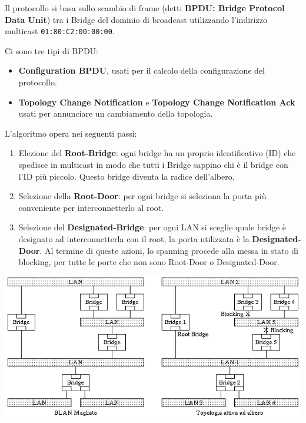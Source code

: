             Il protocollo si basa sullo scambio di frame (detti \textbf{BPDU: Bridge Protocol Data Unit}) tra i Bridge del dominio di broadcast utilizzando l'indirizzo multicast \texttt{01:80:C2:00:00:00}.

            Ci sono tre tipi di BPDU:
            \begin{itemize}
                \item  \textbf{Configuration BPDU}, usati per il calcolo della configurazione del protocollo.
                \item \textbf{Topology Change Notification} e \textbf{Topology Change Notification Ack} usati per annunciare un cambiamento della topologia.
            \end{itemize}

            L'algoritmo opera nei seguenti passi:
            \begin{enumerate}
                \item Elezione del \textbf{Root-Bridge}: ogni bridge ha un proprio identificativo (ID) che spedisce in multicast in modo che tutti i Bridge sappino chi è il bridge con l'ID più piccolo. Questo bridge diventa la radice dell'albero.
                \item Selezione della \textbf{Root-Door}: per ogni bridge si seleziona la porta più conveniente per interconnetterlo al root.
                \item Selezione del \textbf{Designated-Bridge}: per ogni LAN si sceglie quale bridge è designato ad interconnetterla con il root, la porta utilizzata è la \textbf{Designated-Door}. Al termine di queste azioni, lo spanning procede alla messa in stato di blocking, per tutte le porte che non sono Root-Door o Designated-Door.
            \end{enumerate}

            \begin{center}
                \includegraphics[scale=0.35]{chapters/3/assets/schema_s.png}
            \end{center}


